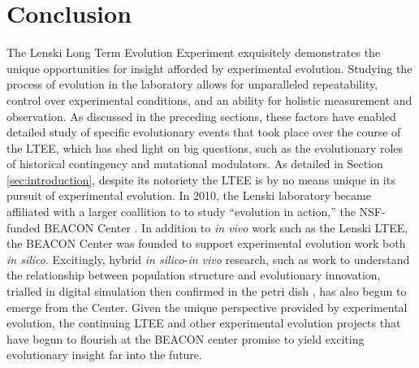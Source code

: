 \section{Conclusion} \label{sec:conclusion}

The Lenski Long Term Evolution Experiment exquisitely demonstrates the unique opportunities for insight afforded by experimental evolution.
Studying the process of evolution in the laboratory allows for unparalleled repeatability, control over experimental conditions, and an ability for holistic measurement and observation.
As discussed in the preceding sections, these factors have enabled detailed study of specific evolutionary events that took place over the course of the LTEE, which has shed light on big questions, such as the evolutionary roles of historical contingency and mutational modulators.
As detailed in Section \ref{sec:introduction}, despite its notoriety the LTEE is by no means unique in its pursuit of experimental evolution.
In 2010, the Lenski laboratory became affiliated with a larger coallition to to study ``evolution in action,'' the NSF-funded BEACON Center \cite{Lenski2017TheSite}.
In addition to \textit{in vivo} work such as the Lenski LTEE, the BEACON Center was founded to support experimental evolution work both \textit{in silico}.
Excitingly, hybrid \textit{in silico}-\textit{in vivo} research, such as work to understand the relationship between population structure and evolutionary innovation, trialled in digital simulation then confirmed in the petri dish \cite{Nahum2015ABacteria.}, has also begun to emerge from the Center. 
Given the unique perspective provided by experimental evolution, the continuing LTEE and other experimental evolution projects that have begun to flourish at the BEACON center promise to yield exciting evolutionary insight far into the future.
